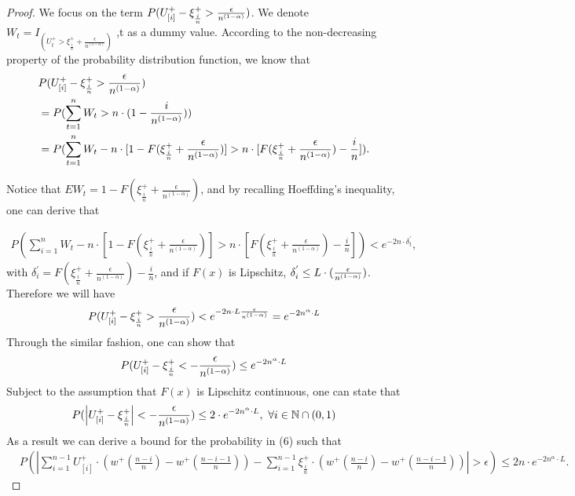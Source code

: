 \begin{proof}
\noindent We focus on the term 
$
P ( U^+_{[i]} - \xi^+_{\frac{i}{n}} > \frac {\epsilon}{n^{(1-\alpha)}})
$.
We denote $W_t= I_{(U^+_t > \xi^+_{\frac{i}{n}} + \frac{\epsilon}{n^{(1-\alpha)}})}$
,t as a dummy value. According to the non-decreasing property of the probability distribution function, we know that 
\begin{align*}
& P ( U^+_{[i]} - \xi^+_{\frac{i}{n}} > \frac {\epsilon}{n^{(1-\alpha)}}) \\ & = P ( \sum _{t=1}^{n} W_t >
n\cdot(1-\frac{i}{n^{(1-\alpha)}})) \\ & = P ( \sum _{t=1}^{n} W_t - n \cdot [1-F(\xi^+_{\frac{i}{n}}
+\frac{\epsilon}{n^{(1-\alpha)}})] > n \cdot [F(\xi^+_{\frac{i}{n}} +\frac{\epsilon}{n^{(1-\alpha)}})
- \frac{i}{n}]).
\end{align*}

\noindent Notice that 
$E W_t = 1-F(\xi^+_{\frac{i}{n}} +\frac{\epsilon}{n^{(1-\alpha)}})$, and by recalling Hoeffding's inequality, one can derive that

\begin{align}
P ( \sum _{i=1}^{n} W_t - n \cdot [1-F(\xi^+_{\frac{i}{n}} +\frac{\epsilon}{n^{(1-\alpha) }  } ) ] > n
\cdot [F(\xi^+_{\frac{i}{n}} +\frac{\epsilon}{n^{(1-\alpha)} } ) - \frac{i}{n}]) < e^{-2n\cdot
\delta^{'}_t},
\end{align}
with $\delta^{'}_i = F(\xi^+_{\frac{i}{n}} +\frac{\epsilon} {n^{(1-\alpha)} }) - \frac{i}{n}$, and if 
$F(x)$ is Lipschitz, $ \delta^{'}_i \leq L \cdot (\frac{\epsilon}{n^{(1-\alpha)}})$.
Therefore we will have
\begin{align}
P ( U^+_{[i]} - \xi^+_{\frac{i}{n}} > \frac {\epsilon}{n^{(1-\alpha)}}) < e^{-2n\cdot L
\frac{\epsilon}{n^{(1-\alpha)}} } = e^{-2n^\alpha \cdot L }
\end{align}
Through the similar fashion, one can show that 
\begin{align*}
P ( U^+_{[i]} -\xi^+_{\frac{i}{n}} < -\frac {\epsilon} {n^{(1-\alpha)}}) \leq e^{-2n^\alpha \cdot L }
\end{align*}
Subject to the assumption that $F(x)$ is Lipschitz continuous, one can state that 
\begin{align*}
P ( \left| U^+_{[i]} -\xi^+_{\frac{i}{n}} \right| < -\frac {\epsilon} {n^{(1-\alpha)}}) \leq 2\cdot
e^{-2n^\alpha \cdot L } , \text{   }\forall i\in \mathbb{N} \cap (0,1) 
\end{align*}
As a result we can derive a bound for the probability in (6) such that
\begin{align}
&
P ( \left| \sum_{i=1}^{n-1} U^+_{[i]} \cdot (w^+(\frac{n-i}{n} )  - w^+(\frac{n-i-1}{n} ) ) -
\sum_{i=1}^{n-1} \xi^+_{\frac{i}{n}} \cdot (w^+(\frac{n-i}{n} )  - w^+(\frac{n-i-1}{n} ) ) \right| >
\epsilon) \leq 2n\cdot e^{-2n^\alpha \cdot L}.\label{eq:holder-sample-complexity-extract}
\end{align}


\end{proof}
